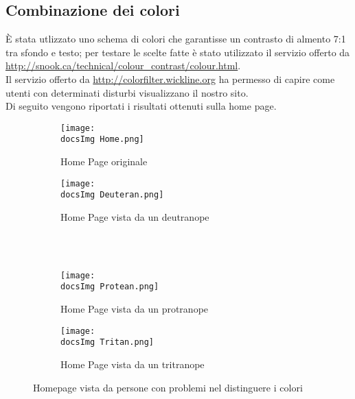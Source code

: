 {	\subsection{Combinazione dei colori}{
		È stata utlizzato uno schema di colori che garantisse un contrasto di almento 7:1 tra sfondo e testo; per testare le scelte fatte è stato utilizzato il servizio offerto da \url{http://snook.ca/technical/colour_contrast/colour.html}.\\
		Il servizio offerto da \url{http://colorfilter.wickline.org} ha permesso di capire come utenti con determinati disturbi visualizzano il nostro sito.\\
		Di seguito vengono riportati i risultati ottenuti sulla home page.
		\begin{figure}[H]
			\begin{subfigure}[b]{0.5\textwidth}
				\texttt{[image: \\docsImg Home.png]}
				\caption{Home Page originale}
				\label{Home Page originale}
			\end{subfigure}
			\begin{subfigure}[b]{0.5\textwidth}
				\texttt{[image: \\docsImg Deuteran.png]}
				\caption{Home Page vista da un deutranope}
				\label{Home Page vista da un deutranope}
			\end{subfigure}
			\\
			\\
			\begin{subfigure}[b]{0.5\textwidth}
				\texttt{[image: \\docsImg Protean.png]}
				\caption{Home Page vista da un protranope}
				\label{Home Page vista da un protranope}
			\end{subfigure}
			\begin{subfigure}[b]{0.5\textwidth}
			\texttt{[image: \\docsImg Tritan.png]}
				\caption{Home Page vista da un tritranope}
				\label{Home Page vista da un tritranope}
			\end{subfigure}
			\caption{Homepage vista da persone con problemi nel distinguere i colori}
			\label{fig: Homepage vista da persone con problemi nel distinguere i colori}
		\end{figure}
	}
}